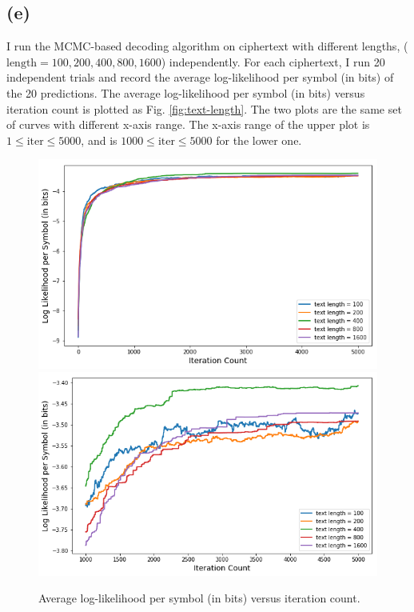 \documentclass[12pt]{article}
\begin{document}
\subsection{(e)}
I run the MCMC-based decoding algorithm on ciphertext with different lengths, ($\text{length}= 100, 200, 400, 800, 1600$) independently. For each ciphertext, I run 20 independent trials and record the average log-likelihood per symbol (in bits) of the 20 predictions. The average log-likelihood per symbol (in bits) versus iteration count is plotted as Fig. \ref{fig:text-length}. The two plots are the same set of curves with different x-axis range. The x-axis range of the upper plot is $1\leq\text{iter}\leq5000$, and is $1000\leq\text{iter}\leq5000$ for the lower one. 
\begin{figure}[H]
	\centering
	\includegraphics[width=0.9\linewidth]{pics/entropy-1.png}
	\includegraphics[width=0.9\linewidth]{pics/entropy-2.png}
	\caption{Average log-likelihood per symbol (in bits) versus iteration count.}
	\label{fig:entropy}
\end{figure}
\end{document}
